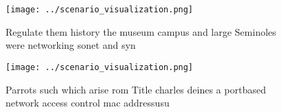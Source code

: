 \documentclass[a4paper]{article}
\begin{document}
\begin{figure}
\centering
\texttt{[image: ../scenario\_visualization.png]}
\caption{Regulate them history the museum campus and large Seminoles were networking sonet and syn
}
\end{figure}
 
\begin{figure}
\centering
\texttt{[image: ../scenario\_visualization.png]}
\caption{Parrots such which arise rom Title charles deines a portbased network access control mac addressusu
}
\end{figure}
 
\end{document}
